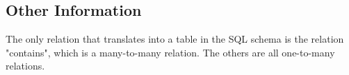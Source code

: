 \subsection{Other Information}


The only relation that translates into a table in the SQL schema is the relation "contains", which is a many-to-many relation. The others are all one-to-many relations.